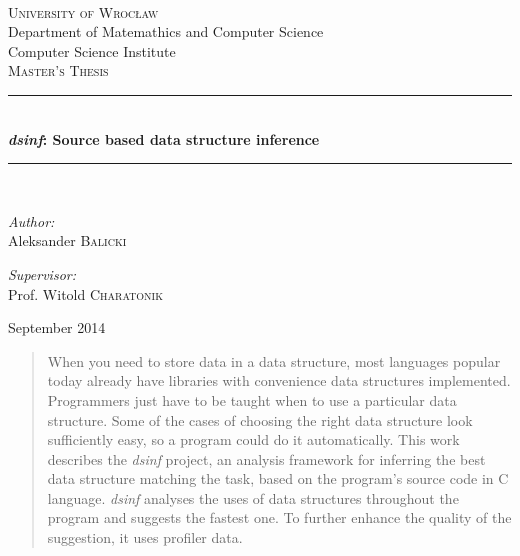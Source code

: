 \documentclass[a4paper,11pt]{article}
\newcommand{\HRule}{\rule{\linewidth}{0.5mm}}
\begin{document}

\begin{titlepage}
\begin{center}

\textsc{\LARGE \\ University of Wrocław} \\
Department of Matemathics and Computer Science \\
Computer Science Institute\\[1.5cm]

\textsc{\Large Master's Thesis}\\[0.5cm]

\HRule \\[0.4cm]
{ \huge \bfseries \emph{dsinf}: Source based data structure inference \\[0.4cm] }

\HRule \\[1.5cm]

\begin{minipage}{0.4\textwidth}
\begin{flushleft} \large
\emph{Author:}\\
Aleksander \textsc{Balicki}
\end{flushleft}
\end{minipage}
\begin{minipage}{0.4\textwidth}
\begin{flushright} \large
\emph{Supervisor:} \\
Prof. Witold \textsc{Charatonik}
\end{flushright}
\end{minipage}

\vfill

{\large September 2014}
\thispagestyle{empty}
\end{center}
\end{titlepage}

\vfill

\pagebreak

\renewcommand{\abstractname}{Abstract}
\begin{abstract}

    When you need to store data in a data structure, most languages popular
    today already have libraries with convenience data structures implemented.
    Programmers just have to be taught when to use a particular data structure. Some of
    the cases of choosing the right data structure look sufficiently easy, so a
    program could do it automatically. This work describes the \emph{dsinf} project,
    an analysis framework for inferring the best data structure matching the task,
    based on the program's source code in C language. \emph{dsinf} analyses the 
    uses of data structures throughout the program and suggests the fastest one.     
    To further enhance the quality of the suggestion, it uses profiler data.

\end{abstract}
\thispagestyle{empty}
\pagebreak
\end{document}
